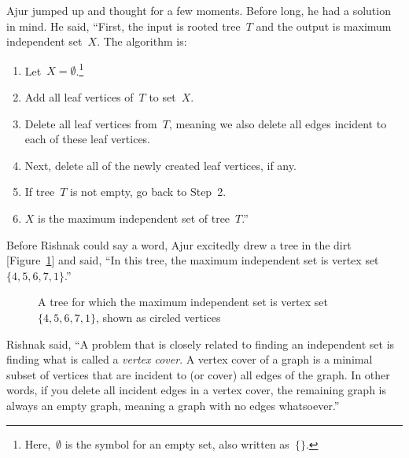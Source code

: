 Ajur jumped up and thought for a few moments. Before long, he had a solution in mind. He said, ``First, the input is rooted tree~$T$ and the output is maximum independent set~$X$. The algorithm is:
\begin{enumerate}
    \item Let~$X=\emptyset$.\footnote{Here,~$\emptyset$ is the symbol for an empty set, also written as~$\{\}$.}
    \item Add all leaf vertices of~$T$ to set~$X$.
    \item Delete all leaf vertices from~$T$, meaning we also delete all edges incident to each of these leaf vertices.
    \item Next, delete all of the newly created leaf vertices, if any.
    \item If tree~$T$ is not empty, go back to Step~2.
    \item $X$ is the maximum independent set of tree~$T$.''
\end{enumerate}

Before Rishnak could say a word, Ajur excitedly drew a tree in the dirt [Figure~\ref{13g4}] and said, ``In this tree, the maximum independent set is vertex set~$\{4,5,6,7,1\}$.''

\begin{figure}
\begin{center}

\caption{A tree for which the maximum independent set is vertex set~$\{4,5,6,7,1\}$, shown as circled vertices}\label{13g4}
\end{center}
\end{figure}

Rishnak said, ``A problem that is closely related to finding an independent set is finding what is called a \textit{vertex cover}. A vertex cover of a graph is a minimal subset of vertices that are incident to (or cover) all edges of the graph. In other words, if you delete all incident edges in a vertex cover, the remaining graph is always an empty graph, meaning a graph with no edges whatsoever.'' 

